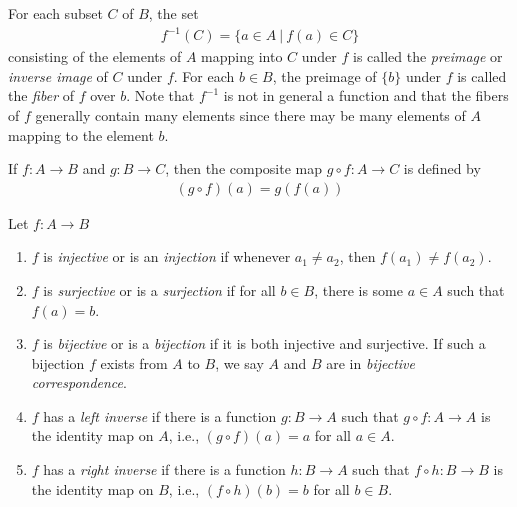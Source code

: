 For each subset $C$ of $B$, the set
\begin{align*}
    f^{-1}(C) = \{a\in A\ |\ f(a)\in C\}
\end{align*}
consisting of the elements of $A$ mapping into $C$ under $f$ is called
the {\sl preimage} or {\sl inverse image} of $C$ under $f$.
For each $b\in B$, the preimage of $\{b\}$ under $f$ is called the {\sl fiber} of $f$ over $b$.
Note that $f^{-1}$ is not in general a function and that the fibers of $f$ generally
contain many elements since there may be many elements of $A$ mapping to the element $b$.

If $f:A\to B$ and $g:B\to C$, then the composite map $g\circ f:A\to C$ is defined by
\begin{align*}
    (g\circ f)(a) = g(f(a))
\end{align*}
\newpage
\thispagestyle{evenpagestyle}
{Let $f:A\to B$
\begin{enumerate}[leftmargin=20pt, itemsep=0pt, topsep=3pt]
    \item $f$ is {\sl injective} or is an {\sl injection} if whenever $a_{1}\neq a_{2}$, then $f(a_{1})\neq f(a_{2})$.
    \item $f$ is {\sl surjective} or is a {\sl surjection} if for all $b\in B$, there is some $a\in A$ such that $f(a)=b$.
    \item $f$ is {\sl bijective} or is a {\sl bijection} if it is both injective and surjective.
    If such a bijection $f$ exists from $A$ to $B$, we say $A$ and $B$ are in {\sl bijective correspondence}.
    \item $f$ has a {\sl left inverse} if there is a function $g:B\to A$ such that $g\circ f: A\to A$ is the identity map on $A$, i.e., $(g\circ f)(a)=a$ for all $a\in A$.
    \item $f$ has a {\sl right inverse} if there is a function $h:B\to A$ such that $f\circ h: B\to B$ is the identity map on $B$, i.e., $(f\circ h)(b)=b$ for all $b\in B$.
\end{enumerate}}


